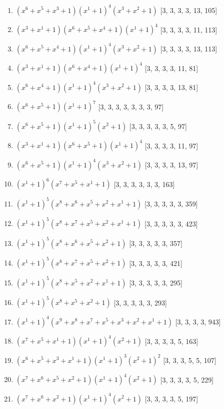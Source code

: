 \documentclass[10pt,twocolumn]{article}
\begin{document}
\begin{enumerate}
\item $(x^{6} + x^{5} + x^{3} + 1)(x^{1} + 1)^{4}(x^{3} + x^{2} + 1)$  [3, 3, 3, 3, 13, 105]
\item $(x^{3} + x^{1} + 1)(x^{6} + x^{5} + x^{4} + 1)(x^{1} + 1)^{4}$  [3, 3, 3, 3, 11, 113]
\item $(x^{6} + x^{5} + x^{4} + 1)(x^{1} + 1)^{4}(x^{3} + x^{2} + 1)$  [3, 3, 3, 3, 13, 113]
\item $(x^{3} + x^{1} + 1)(x^{6} + x^{4} + 1)(x^{1} + 1)^{4}$  [3, 3, 3, 3, 11, 81]
\item $(x^{6} + x^{4} + 1)(x^{1} + 1)^{4}(x^{3} + x^{2} + 1)$  [3, 3, 3, 3, 13, 81]
\item $(x^{6} + x^{5} + 1)(x^{1} + 1)^{7}$  [3, 3, 3, 3, 3, 3, 3, 97]
\item $(x^{6} + x^{5} + 1)(x^{1} + 1)^{5}(x^{2} + 1)$  [3, 3, 3, 3, 3, 5, 97]
\item $(x^{3} + x^{1} + 1)(x^{6} + x^{5} + 1)(x^{1} + 1)^{4}$  [3, 3, 3, 3, 11, 97]
\item $(x^{6} + x^{5} + 1)(x^{1} + 1)^{4}(x^{3} + x^{2} + 1)$  [3, 3, 3, 3, 13, 97]
\item $(x^{1} + 1)^{6}(x^{7} + x^{5} + x^{1} + 1)$  [3, 3, 3, 3, 3, 3, 163]
\item $(x^{1} + 1)^{5}(x^{8} + x^{6} + x^{5} + x^{2} + x^{1} + 1)$  [3, 3, 3, 3, 3, 359]
\item $(x^{1} + 1)^{5}(x^{8} + x^{7} + x^{5} + x^{2} + x^{1} + 1)$  [3, 3, 3, 3, 3, 423]
\item $(x^{1} + 1)^{5}(x^{8} + x^{6} + x^{5} + x^{2} + 1)$  [3, 3, 3, 3, 3, 357]
\item $(x^{1} + 1)^{5}(x^{8} + x^{7} + x^{5} + x^{2} + 1)$  [3, 3, 3, 3, 3, 421]
\item $(x^{1} + 1)^{5}(x^{8} + x^{5} + x^{2} + x^{1} + 1)$  [3, 3, 3, 3, 3, 295]
\item $(x^{1} + 1)^{5}(x^{8} + x^{5} + x^{2} + 1)$  [3, 3, 3, 3, 3, 293]
\item $(x^{1} + 1)^{4}(x^{9} + x^{8} + x^{7} + x^{5} + x^{3} + x^{2} + x^{1} + 1)$  [3, 3, 3, 3, 943]
\item $(x^{7} + x^{5} + x^{1} + 1)(x^{1} + 1)^{4}(x^{2} + 1)$  [3, 3, 3, 3, 5, 163]
\item $(x^{6} + x^{5} + x^{3} + x^{1} + 1)(x^{1} + 1)^{3}(x^{2} + 1)^{2}$  [3, 3, 3, 5, 5, 107]
\item $(x^{7} + x^{6} + x^{5} + x^{2} + 1)(x^{1} + 1)^{4}(x^{2} + 1)$  [3, 3, 3, 3, 5, 229]
\item $(x^{7} + x^{6} + x^{2} + 1)(x^{1} + 1)^{4}(x^{2} + 1)$  [3, 3, 3, 3, 5, 197]

\end{enumerate}
\end{document}

